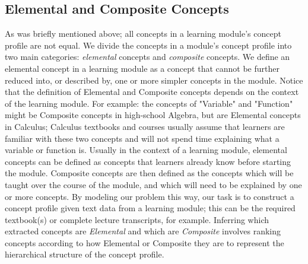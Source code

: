 \subsection{Elemental and Composite Concepts}\label{ec_concepts}
As was briefly mentioned above; all concepts in a learning module's concept profile are not equal.
We divide the concepts in a module's concept profile into two main categories: \textit{elemental} concepts and \textit{composite} concepts. 
We define an elemental concept in a learning module as a concept that cannot be further reduced into, or described by, one or more simpler concepts in the module. Notice that the definition of Elemental and Composite concepts depends on the context of the learning module. For example: the concepts of "Variable" and "Function" might be Composite concepts in high-school Algebra, but are Elemental concepts in Calculus; Calculus textbooks and courses usually assume that learners are familiar with these two concepts and will not spend time explaining what a variable or function is.
Usually in the context of a learning module, elemental concepts can be defined as concepts that learners already know before starting the module. Composite concepts are then defined as the concepts which will be taught over the course of the module, and which will need to be explained by one or more concepts.
By modeling our problem this way, our task is to construct a concept profile given text data from a learning module; this can be the required textbook(s) or complete lecture transcripts, for example. Inferring which extracted concepts are \textit{Elemental} and which are \textit{Composite} involves ranking concepts according to how Elemental or Composite they are to represent the hierarchical structure of the concept profile.
